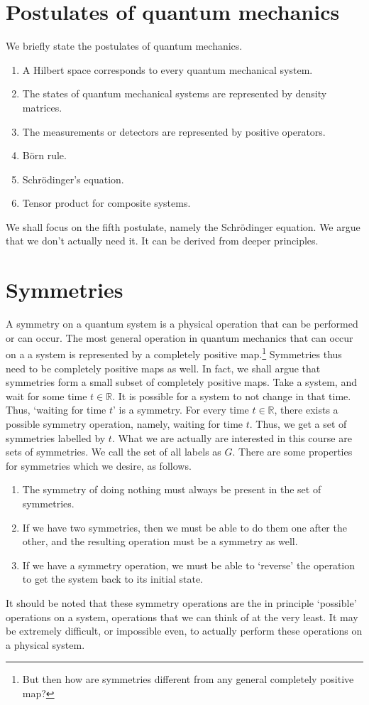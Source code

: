 \documentclass[a4 paper, 12pt, oneside]{book}
\theoremstyle{definition}
\newcommand{\rr}{\mathbb{R}}
\begin{document}
	\section{Postulates of quantum mechanics}

	We briefly state the postulates of quantum mechanics.
	\begin{enumerate}
		\item A Hilbert space corresponds to every quantum mechanical system.
		\item The states of quantum mechanical systems are represented by density matrices.
		\item The measurements or detectors are represented by positive operators.
		\item B\"orn rule.
		\item Schr\"odinger's equation.
		\item Tensor product for composite systems.
	\end{enumerate}
	We shall focus on the fifth postulate, namely the Schr\"odinger equation. We argue that we don't actually need it. It can be derived from deeper principles.

	\section{Symmetries}

	A symmetry on a quantum system is a physical operation that can be performed or can occur. The most general operation in quantum mechanics that can occur on a a system is represented by a completely positive map.\footnote{But then how are symmetries different from any general completely positive map?} Symmetries thus need to be completely positive maps as well. In fact, we shall argue that symmetries form a small subset of completely positive maps.
	Take a system, and wait for some time \(t \in \rr\). It is possible for a system to not change in that time. Thus, `waiting for time \(t\)' is a symmetry. For every time \(t \in \rr\), there exists a possible symmetry operation, namely, waiting for time \(t\). Thus, we get a set of symmetries labelled by \(t\). What we are actually are interested in this course are sets of symmetries. We call the set of all labels as \(G\). There are some properties for symmetries which we desire, as follows.
	\begin{enumerate}
		\item The symmetry of doing nothing must always be present in the set of symmetries.
		\item If we have two symmetries, then we must be able to do them one after the other, and the resulting operation must be a symmetry as well.
		\item If we have a symmetry operation, we must be able to `reverse' the operation to get the system back to its initial state.
	\end{enumerate}
	It should be noted that these symmetry operations are the in principle `possible' operations on a system, operations that we can think of at the very least. It may be extremely difficult, or impossible even, to actually perform these operations on a physical system.
\end{document}
